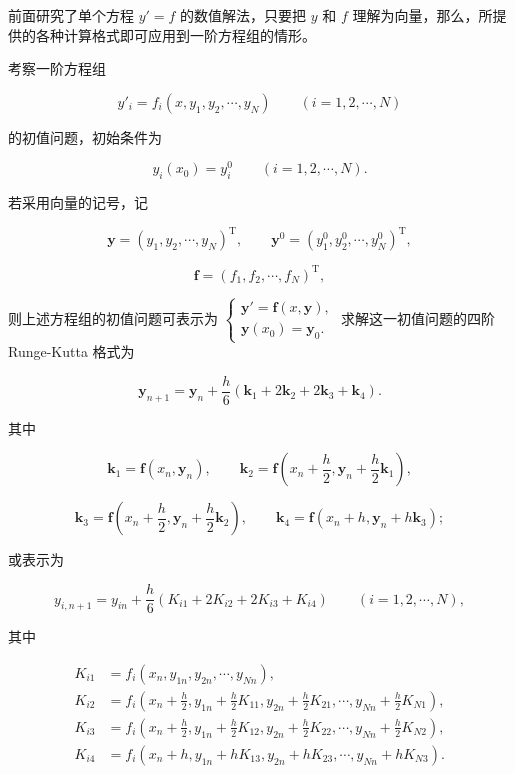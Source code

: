 前面研究了单个方程 \(y'=f\) 的数值解法，只要把 \(y\) 和 \(f\) 理解为向量，那么，所提供的各种计算格式即可应用到一阶方程组的情形。

考察一阶方程组

\[
y'_i=f_i(x,y_1,y_2,\cdots,y_N)\qquad(i=1,2,\cdots,N)
\]

的初值问题，初始条件为

\[
y_i(x_0)=y_i^0\qquad(i=1,2,\cdots,N).
\]

若采用向量的记号，记

\[
\boldsymbol y=(y_1,y_2,\cdots,y_N)^{\mathrm T},\qquad
\boldsymbol y^0=(y_1^0,y_2^0,\cdots,y_N^0)^{\mathrm T},
\]

\[
\boldsymbol f=(f_1,f_2,\cdots,f_N)^{\mathrm T},
\]

则上述方程组的初值问题可表示为 \(\begin{cases}\boldsymbol y'=\boldsymbol f(x,\boldsymbol y),\\\boldsymbol y(x_0)=\boldsymbol y_0.\end{cases}\) 求解这一初值问题的四阶 Runge-Kutta 格式为

\[
\boldsymbol y_{n+1}=\boldsymbol y_n+\frac h6(\boldsymbol k_1+2\boldsymbol k_2+2\boldsymbol k_3+\boldsymbol k_4).
\]

其中

\[
\boldsymbol k_1=\boldsymbol f(x_n,\boldsymbol y_n),\qquad
\boldsymbol k_2=\boldsymbol f\left(x_n+\frac h2,\boldsymbol y_n+\frac h2\boldsymbol k_1\right),
\]

\[
\boldsymbol k_3=\boldsymbol f\left(x_n+\frac h2,\boldsymbol y_n+\frac h2\boldsymbol k_2\right),\qquad
\boldsymbol k_4=\boldsymbol f(x_n+h,\boldsymbol y_n+h\boldsymbol k_3);
\]

或表示为

\[
y_{i,n+1}=y_{in}+\frac h6(K_{i1}+2K_{i2}+2K_{i3}+K_{i4})\qquad(i=1,2,\cdots,N),
\]

其中

\[
\begin{aligned}
K_{i1}&=f_i(x_n,y_{1n},y_{2n},\cdots,y_{Nn}),\\
K_{i2}&=f_i\left(x_n+\frac h2,y_{1n}+\frac h2K_{11},y_{2n}+\frac h2K_{21},\cdots,y_{Nn}+\frac h2K_{N1}\right),\\
K_{i3}&=f_i\left(x_n+\frac h2,y_{1n}+\frac h2K_{12},y_{2n}+\frac h2K_{22},\cdots,y_{Nn}+\frac h2K_{N2}\right),\\
K_{i4}&=f_i(x_n+h,y_{1n}+hK_{13},y_{2n}+hK_{23},\cdots,y_{Nn}+hK_{N3}).
\end{aligned}
\]

